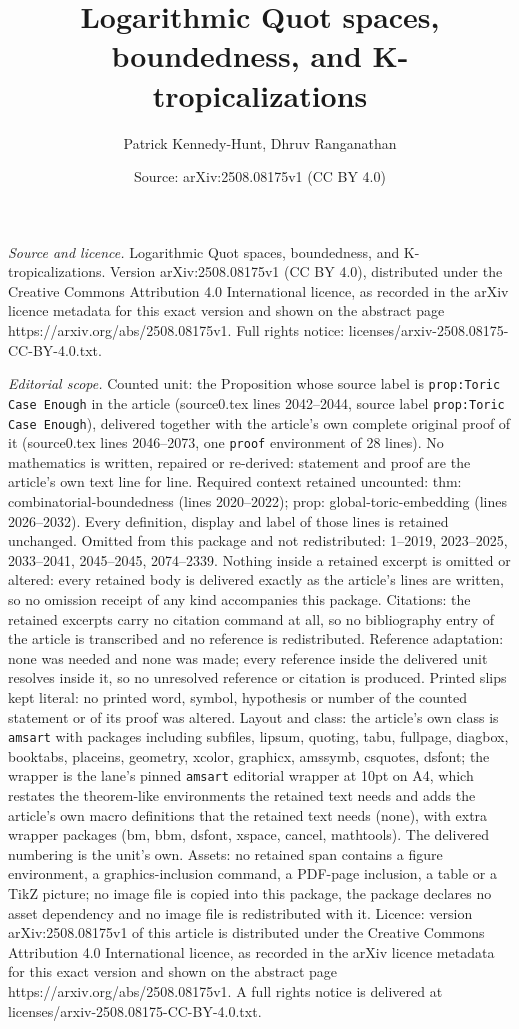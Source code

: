 \documentclass[10pt,a4paper]{amsart}
\title[Logarithmic Quot spaces, boundedness, and K-tropicalizations]{Logarithmic Quot spaces, boundedness, and K-tropicalizations}
\author{Patrick Kennedy-Hunt, Dhruv Ranganathan}
\date{Source: arXiv:2508.08175v1 (CC BY 4.0)}
\begin{document}
\maketitle

\noindent\emph{Source and licence.} Logarithmic Quot spaces, boundedness, and K-tropicalizations. Version arXiv:2508.08175v1 (CC BY 4.0), distributed under the Creative Commons Attribution 4.0 International licence, as recorded in the arXiv licence metadata for this exact version and shown on the abstract page https://arxiv.org/abs/2508.08175v1. Full rights notice: licenses/arxiv-2508.08175-CC-BY-4.0.txt.\par\smallskip

\noindent\textit{Editorial scope.} Counted unit: the Proposition whose source label is \texttt{prop:Toric Case Enough} in the article (source0.tex lines 2042--2044, source label \texttt{prop:Toric Case Enough}), delivered together with the article's own complete original proof of it (source0.tex lines 2046--2073, one \texttt{proof} environment of 28 lines). No mathematics is written, repaired or re-derived: statement and proof are the article's own text line for line. Required context retained uncounted: thm: combinatorial-boundedness (lines 2020--2022); prop: global-toric-embedding (lines 2026--2032). Every definition, display and label of those lines is retained unchanged. Omitted from this package and not redistributed: 1--2019, 2023--2025, 2033--2041, 2045--2045, 2074--2339. Nothing inside a retained excerpt is omitted or altered: every retained body is delivered exactly as the article's lines are written, so no omission receipt of any kind accompanies this package. Citations: the retained excerpts carry no citation command at all, so no bibliography entry of the article is transcribed and no reference is redistributed. Reference adaptation: none was needed and none was made; every reference inside the delivered unit resolves inside it, so no unresolved reference or citation is produced. Printed slips kept literal: no printed word, symbol, hypothesis or number of the counted statement or of its proof was altered. Layout and class: the article's own class is \texttt{amsart} with packages including subfiles, lipsum, quoting, tabu, fullpage, diagbox, booktabs, placeins, geometry, xcolor, graphicx, amssymb, csquotes, dsfont; the wrapper is the lane's pinned \texttt{amsart} editorial wrapper at 10pt on A4, which restates the theorem-like environments the retained text needs and adds the article's own macro definitions that the retained text needs (none), with extra wrapper packages (bm, bbm, dsfont, xspace, cancel, mathtools). The delivered numbering is the unit's own. Assets: no retained span contains a figure environment, a graphics-inclusion command, a PDF-page inclusion, a table or a TikZ picture; no image file is copied into this package, the package declares no asset dependency and no image file is redistributed with it. Licence: version arXiv:2508.08175v1 of this article is distributed under the Creative Commons Attribution 4.0 International licence, as recorded in the arXiv licence metadata for this exact version and shown on the abstract page https://arxiv.org/abs/2508.08175v1. A full rights notice is delivered at licenses/arxiv-2508.08175-CC-BY-4.0.txt. 
\end{document}
